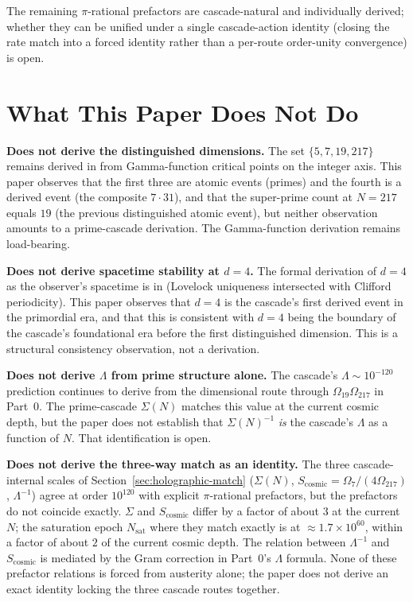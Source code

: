 \documentclass[11pt,a4paper]{article}
\begin{document}
The remaining $\pi$-rational prefactors are cascade-natural and
individually derived; whether they can be unified under a single
cascade-action identity (closing the rate match into a forced
identity rather than a per-route order-unity convergence) is open.

\section{What This Paper Does Not Do}\label{sec:does-not-do}

\textbf{Does not derive the distinguished dimensions.} The set
$\{5, 7, 19, 217\}$ remains derived in  from
Gamma-function critical points on the integer axis. This paper
observes that the first three are atomic events (primes) and the
fourth is a derived event (the composite $7 \cdot 31$), and that the
super-prime count at $N = 217$ equals $19$ (the previous distinguished
atomic event), but neither observation amounts to a prime-cascade
derivation. The Gamma-function derivation remains load-bearing.

\textbf{Does not derive spacetime stability at $d = 4$.} The formal
derivation of $d = 4$ as the observer's spacetime is in
 (Lovelock uniqueness intersected with
Clifford periodicity). This paper observes that $d = 4$ is the
cascade's first derived event in the primordial era, and that this is
consistent with $d = 4$ being the boundary of the cascade's
foundational era before the first distinguished dimension. This is a
structural consistency observation, not a derivation.

\textbf{Does not derive $\Lambda$ from prime structure alone.} The
cascade's $\Lambda \sim 10^{-120}$ prediction continues to derive
from the dimensional route through $\Omega_{19} \Omega_{217}$ in
Part~0. The prime-cascade $\Sigma(N)$ matches this value at the
current cosmic depth, but the paper does not establish that
$\Sigma(N)^{-1}$ \emph{is} the cascade's $\Lambda$ as a function of
$N$. That identification is open.

\textbf{Does not derive the three-way match as an identity.} The
three cascade-internal scales of
Section~\ref{sec:holographic-match} ($\Sigma(N)$,
$S_{\mathrm{cosmic}} = \Omega_7/(4\Omega_{217})$, $\Lambda^{-1}$)
agree at order $10^{120}$ with explicit $\pi$-rational prefactors,
but the prefactors do not coincide exactly. $\Sigma$ and
$S_{\mathrm{cosmic}}$ differ by a factor of about $3$ at the current
$N$; the saturation epoch $N_{\mathrm{sat}}$ where they match
exactly is at $\approx 1.7 \times 10^{60}$, within a factor of about
$2$ of the current cosmic depth. The relation between
$\Lambda^{-1}$ and $S_{\mathrm{cosmic}}$ is mediated by the Gram
correction in Part~0's $\Lambda$ formula. None of these prefactor
relations is forced from austerity alone; the paper does not derive
an exact identity locking the three cascade routes together.
\end{document}
